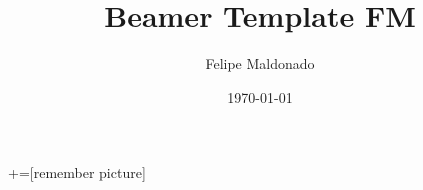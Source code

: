 \documentclass[12 pt]{beamer}
\author[Felipe Maldonado | \textcolor{darkcharcoal}{Felipe.Maldonado@data61.csiro.au |}]{Felipe Maldonado} %
\title[Beamer Template FM]{Beamer Template FM} %
\institute{Australian National University, Data61.}
\date{\today}
\begin{document}

+=[remember picture]





% 	
\end{document}
